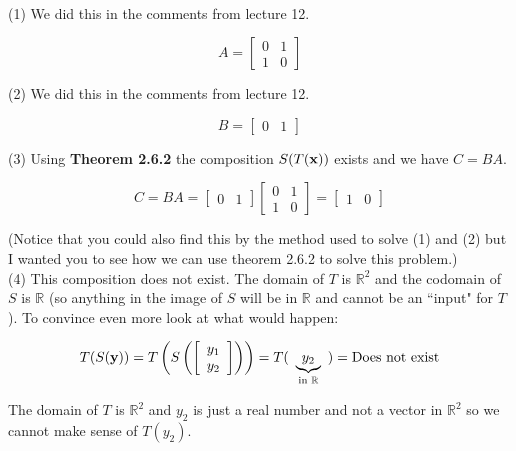 \documentclass[12pt]{article}
\begin{document}
\\
\noindent(1) We did this in the comments from lecture 12.

\[ A =\left[ \begin{array}{cc} 0 &1\\1&0  \end{array} \right]  \]


\noindent(2) We did this in the comments from lecture 12.

\[ B =\left[ \begin{array}{cc} 0 &1  \end{array} \right]  \]

\noindent(3) Using {\bf Theorem 2.6.2} the composition $S(T({\bf x}))$ exists and we have $C=BA$.

\[ C=BA = \left[ \begin{array}{cc} 0 &1  \end{array} \right] \left[ \begin{array}{cc} 0 &1\\1&0  \end{array} \right] =  \left[ \begin{array}{cc} 1 &0  \end{array} \right]\] 

(Notice that you could also find this by the method used to solve (1) and (2) but I wanted you to see how we can use theorem 2.6.2 to solve this problem.)\\

\noindent(4) This composition does not exist.  The domain of $T$ is $\mathbb{R}^2$ and the codomain of $S$ is $\mathbb{R}$ (so anything in the image of $S$ will be in $\mathbb{R}$ and cannot be an ``input" for $T$).  To convince even more look at what would happen:

\[ T(S({\bf y})) = T\left(S\left(  \left[ \begin{array}{c} y_1 \\ y_2  \end{array} \right] \right)\right) = T(\text{ }\underbrace{y_2}_{\text{in }\mathbb{R}}\text{ }) = \text{Does not exist}\]

The domain of $T$ is $\mathbb{R}^2$ and $y_2$ is just a real number and not a vector in $\mathbb{R}^2$ so we cannot make sense of $T(y_2)$.



\end{document}
